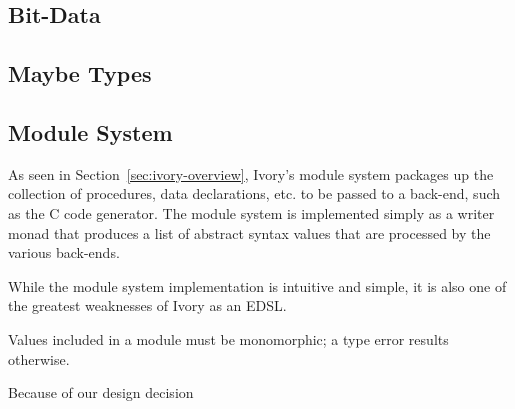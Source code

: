\begin{code}
\end{code}

\subsection{Bit-Data}

\subsection{Maybe Types}

\subsection{Module System}

As seen in Section~\ref{sec:ivory-overview}, Ivory's module system packages up
the collection of procedures, data declarations, etc. to be passed to a
back-end, such as the C code generator. The module system is implemented simply
as a writer monad that produces a list of abstract syntax values that are
processed by the various back-ends.

While the module system implementation is intuitive and simple, it is also one
of the greatest weaknesses of Ivory as an EDSL. 

Values included in a module must be monomorphic; a type error results
otherwise. 

Because of our design decision 








